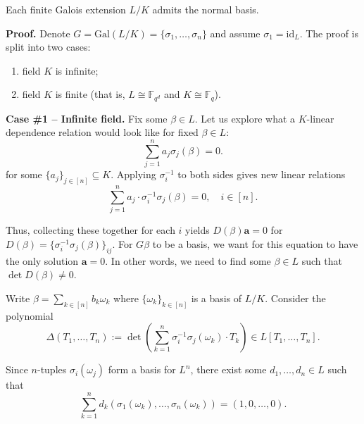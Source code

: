 \documentclass{template}
\begin{document}
\begin{theorem}
    Each finite Galois extension $L/K$ admits the normal basis.
\end{theorem}

\textbf{Proof.} Denote $G = \text{Gal}(L/K) = \{\sigma_1,\dots,\sigma_n\}$ and
assume $\sigma_1 = \text{id}_L$. The proof is split into two cases:
\begin{enumerate}
    \item field $K$ is infinite;
    \item field $K$ is finite (that is, $L \cong \mathbb{F}_{q^d}$ and $K \cong
    \mathbb{F}_q$).
\end{enumerate}

\textcolor{blue!70!black}{\textbf{Case \#1 -- Infinite field.}} Fix some $\beta
\in L$. Let us explore what a $K$-linear dependence relation would look like for
fixed $\beta \in L$:
\begin{equation*}
    \sum_{j=1}^n a_j\sigma_j(\beta) = 0.
\end{equation*}
for some $\{a_j\}_{j \in [n]} \subseteq K$. Applying $\sigma_i^{-1}$ 
to both sides gives new linear relations
\begin{equation*}
    \sum_{j=1}^na_j \cdot \sigma_i^{-1}\sigma_j(\beta) = 0, \quad i \in [n].
\end{equation*}

Thus, collecting these together for each $i$ yields $D(\beta)\mathbf{a}=0$ for
$D(\beta)=\{\sigma_i^{-1}\sigma_j(\beta)\}_{ij}$. For $G\beta$ to be a basis, we
want for this equation to have the only solution $\mathbf{a}=0$. In other words,
we need to find some $\beta \in L$ such that $\det D(\beta) \neq 0$.

Write $\beta = \sum_{k \in [n]}b_k\omega_k$ where $\{\omega_k\}_{k \in [n]}$ is
a basis of $L/K$. Consider the polynomial
\begin{equation*}
    \Delta(T_1,\dots,T_n) := \det\left(\sum_{k=1}^n \sigma_i^{-1}\sigma_j(\omega_k) \cdot T_k\right) \in L[T_1,\dots,T_n].
\end{equation*}

Since $n$-tuples $\sigma_i(\omega_j)$ form a basis for $L^n$, there exist some $d_1,\dots,d_n \in L$ such that
\begin{equation*}
    \sum_{k=1}^n d_k(\sigma_1(\omega_k), \dots, \sigma_n(\omega_k)) = (1,0,\dots,0).
\end{equation*} 
\end{document}
